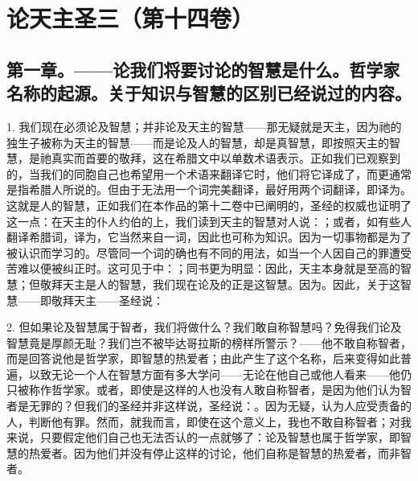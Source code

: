 \section{论天主圣三（第十四卷）}

\par


\subsection{第一章。——论我们将要讨论的智慧是什么。哲学家名称的起源。关于知识与智慧的区别已经说过的内容。}

1. 我们现在必须论及智慧；并非论及天主的智慧——那无疑就是天主，因为祂的独生子被称为天主的智慧——而是论及人的智慧，却是真智慧，即按照天主的智慧，是祂真实而首要的敬拜，这在希腊文中以单数术语表示。正如我们已观察到的，当我们的同胞自己也希望用一个术语来翻译它时，他们将它译成了，而更通常是指希腊人所说的。但由于无法用一个词完美翻译，最好用两个词翻译，即译为。这就是人的智慧，正如我们在本作品的第十二卷中已阐明的，圣经的权威也证明了这一点：在天主的仆人约伯的上，我们读到天主的智慧对人说：；或者，如有些人翻译希腊词，译为，它当然来自一词，因此也可称为知识。因为一切事物都是为了被认识而学习的。尽管同一个词的确也有不同的用法，如当一个人因自己的罪遭受苦难以便被纠正时。这可见于中：；同书更为明显：因此，天主本身就是至高的智慧；但敬拜天主是人的智慧，我们现在论及的正是这智慧。因为。因此，关于这智慧——即敬拜天主——圣经说：\par

2. 但如果论及智慧属于智者，我们将做什么？我们敢自称智慧吗？免得我们论及智慧竟是厚颜无耻？我们岂不被毕达哥拉斯的榜样所警示？——他不敢自称智者，而是回答说他是哲学家，即智慧的热爱者；由此产生了这个名称，后来变得如此普遍，以致无论一个人在智慧方面有多大学问——无论在他自己或他人看来——他仍只被称作哲学家。或者，即使是这样的人也没有人敢自称智者，是因为他们认为智者是无罪的？但我们的圣经并非这样说，圣经说：。因为无疑，认为人应受责备的人，判断他有罪。然而，就我而言，即使在这个意义上，我也不敢自称智者；对我来说，只要假定他们自己也无法否认的一点就够了：论及智慧也属于哲学家，即智慧的热爱者。因为他们并没有停止这样的讨论，他们自称是智慧的热爱者，而非智者。\par

